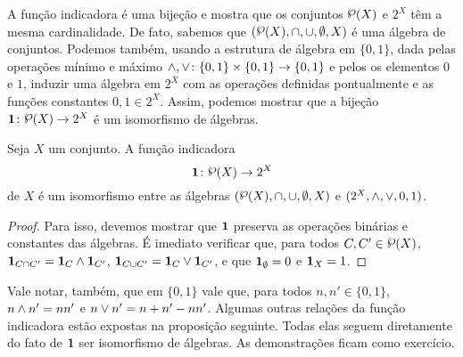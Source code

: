 A função indicadora é uma bijeção e mostra que os conjuntos $\p(X)$ e $2^X$ têm a mesma cardinalidade. De fato, sabemos que $(\p(X),\cap,\cup,\emptyset,X)$ é uma álgebra de conjuntos. Podemos também, usando a estrutura de álgebra em $\{0,1\}$, dada pelas operações mínimo e máximo $\mathbin{\wedge},\mathbin{\vee}\colon \{0,1\} \times \{0,1\} \to \{0,1\}$ e pelos os elementos $0$ e $1$, induzir uma álgebra em $2^X$ com as operações definidas pontualmente e as funções constantes $0,1 \in 2^X$. Assim, podemos mostrar que a bijeção $\idc\colon \p(X) \to 2^X$ é um isomorfismo de álgebras.

\begin{proposition}
Seja $X$ um conjunto. A função indicadora
	\begin{equation*}
	\idc\colon \p(X) \to 2^X
	\end{equation*}
de $X$ é um isomorfismo entre as álgebras $(\p(X),\cap,\cup,\emptyset,X)$ e $(2^X,\mathbin{\wedge},\mathbin{\vee},0,1)$.
\end{proposition}
\begin{proof}
Para isso, devemos mostrar que ${\bm 1}$ preserva as operações binárias e constantes das álgebras. É imediato verificar que, para todos $C,C' \in \p(X)$, ${\bm 1}_{C \cap C'} = {\bm 1}_C \mathbin{\wedge} {\bm 1}_{C'}$, ${\bm 1}_{C \cup C'} = {\bm 1}_C \mathbin{\vee} {\bm 1}_{C'}$, e que ${\bm 1}_\emptyset = 0$ e ${\bm 1}_X = 1$.
\end{proof}

Vale notar, também, que em $\{0,1\}$ vale que, para todos $n,n' \in \{0,1\}$, $n \mathbin{\wedge} n' = nn'$ e $n \mathbin{\vee} n' = n+n'-nn'$. Algumas outras relações da função indicadora estão expostas na proposição seguinte. Todas elas seguem diretamente do fato de ${\bm 1}$ ser isomorfismo de álgebras. As demonstrações ficam como exercício.

